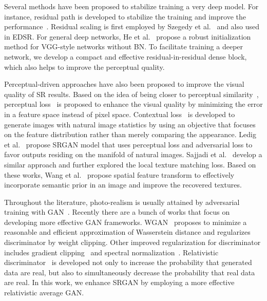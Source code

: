 \documentclass[runningheads]{llncs}
\begin{document}
Several methods have been proposed to stabilize training a very deep model. 
For instance, residual path is developed to stabilize the training and improve the 
performance~\cite{he2016deep,kim2016accurate,zhang2018image}.
Residual scaling is first employed by Szegedy et al.~\cite{szegedy2016inception} and also used in EDSR.
For general deep networks, He et al.~\cite{he2015delving} propose a robust initialization method for VGG-style 
networks without BN.
To facilitate training a deeper network, we develop a compact and effective residual-in-residual dense block, 
which also helps to improve the perceptual quality.

Perceptual-driven approaches have also been proposed to improve the visual quality of SR results. 
Based on the idea of being closer to perceptual similarity~\cite{gatys2015texture,bruna2015super}, perceptual 
loss~\cite{johnson2016perceptual} is proposed to enhance the visual quality by minimizing the error in a feature space 
instead of pixel space.
Contextual loss~\cite{roey2018maintaining} is developed to generate images with natural image statistics by using an  
objective that focuses on the feature distribution rather than merely comparing the appearance.
Ledig et al.~\cite{ledig2017photo} propose SRGAN model that uses perceptual loss and adversarial loss to favor 
outputs residing on the manifold of natural images. 
Sajjadi et al.~\cite{sajjadi2017enhancenet} develop a similar approach and further explored the local texture matching 
loss.
Based on these works, Wang et al.~\cite{wang2018sftgan} propose spatial feature transform to effectively incorporate  
semantic prior in an image and improve the recovered textures. 

Throughout the literature, photo-realism is usually attained by adversarial training with  
GAN~\cite{goodfellow2014generative}.
Recently there are a bunch of works that focus on developing more effective GAN frameworks. 
WGAN~\cite{arjovsky2017wasserstein} proposes to minimize a reasonable and efficient approximation of Wasserstein 
distance and regularizes discriminator by weight clipping.
Other improved regularization for discriminator includes gradient clipping~\cite{gulrajani2017improved} and spectral 
normalization~\cite{miyato2018spectral}.
Relativistic discriminator~\cite{jolicoeur2018relativistic} is developed not only to increase the probability that  
generated data are real, but also to simultaneously decrease the probability that real data are real. 
In this work, we enhance SRGAN by employing a more effective relativistic average GAN.
\end{document}
